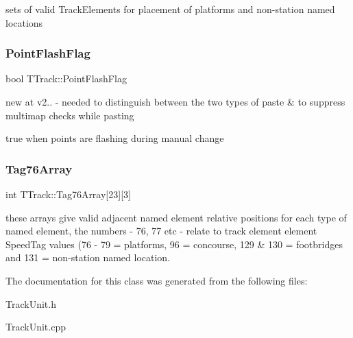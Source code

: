 sets of valid Track\+Elements for placement of platforms and non-\/station named locations \mbox{\label{class_t_track_a50f518fa93ef56b1570e4102fb691e14}} 
\subsubsection{\texorpdfstring{Point\+Flash\+Flag}{PointFlashFlag}}
{\footnotesize\ttfamily bool T\+Track\+::\+Point\+Flash\+Flag}



new at v2.. -\/ needed to distinguish between the two types of paste \& to suppress multimap checks while pasting 

true when points are flashing during manual change \mbox{\label{class_t_track_a8dc657245d548b3b07fdb42e173f3bba}} 
\subsubsection{\texorpdfstring{Tag76\+Array}{Tag76Array}}
{\footnotesize\ttfamily int T\+Track\+::\+Tag76\+Array\mbox{[}23\mbox{]}\mbox{[}3\mbox{]}\hspace{0.3cm}{\ttfamily [private]}}

these arrays give valid adjacent named element relative positions for each type of named element, the numbers -\/ 76, 77 etc -\/ relate to track element element Speed\+Tag values (76 -\/ 79 = platforms, 96 = concourse, 129 \& 130 = footbridges and 131 = non-\/station named location. 

The documentation for this class was generated from the following files\+:\begin{DoxyCompactItemize}
\item 
Track\+Unit.\+h\item 
Track\+Unit.\+cpp\end{DoxyCompactItemize}
